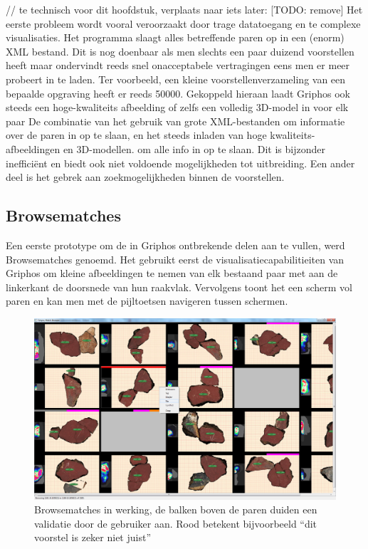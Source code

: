 // te technisch voor dit hoofdstuk, verplaats naar iets later: [TODO: remove]
Het eerste probleem wordt vooral veroorzaakt door trage datatoegang en te complexe visualisaties. Het programma slaagt alles betreffende paren op in een (enorm) XML bestand. Dit is nog doenbaar als men slechts een paar duizend voorstellen heeft maar ondervindt reeds snel onacceptabele vertragingen eens men er meer probeert in te laden. Ter voorbeeld, een kleine voorstellenverzameling van een bepaalde opgraving heeft er reeds 50000. Gekoppeld hieraan laadt Griphos ook steeds een hoge-kwaliteits afbeelding of zelfs een volledig 3D-model in voor elk paar De combinatie van het gebruik van grote XML-bestanden om informatie over de paren in op te slaan, en het steeds inladen van hoge kwaliteits-afbeeldingen en 3D-modellen. om alle info in op te slaan. Dit is bijzonder ineffici\"ent en biedt ook niet voldoende mogelijkheden tot uitbreiding. Een ander deel is het gebrek aan zoekmogelijkheden binnen de voorstellen.

\subsection{Browsematches}

Een eerste prototype om de in Griphos ontbrekende delen aan te vullen, werd Browsematches genoemd. Het gebruikt eerst de visualisatiecapabilitieiten van Griphos om kleine afbeeldingen te nemen van elk bestaand paar met aan de linkerkant de doorsnede van hun raakvlak. Vervolgens toont het een scherm vol paren en kan men met de pijltoetsen navigeren tussen schermen. \\

\begin{figure}[ht]
	\begin{center}
		\includegraphics[width=.8\columnwidth]{images/browsematches-01-cut.png}
		\caption{Browsematches in werking, de balken boven de paren duiden een validatie door de gebruiker aan. Rood betekent bijvoorbeeld ``dit voorstel is zeker niet juist''}
	\end{center}
\end{figure}

